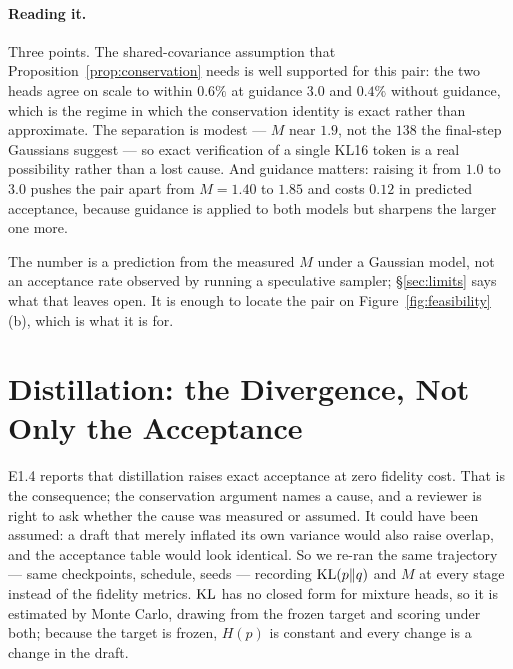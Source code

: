 \paragraph{Reading it.} Three points. The shared-covariance assumption that
Proposition~\ref{prop:conservation} needs is well supported for this pair: the two heads agree on
scale to within $0.6\%$ at guidance $3.0$ and $0.4\%$ without guidance, which is the regime in which
the conservation identity is exact rather than approximate. The separation is modest --- $M$ near
$1.9$, not the $138$ the final-step Gaussians suggest --- so exact verification of a single KL16
token is a real possibility rather than a lost cause. And guidance matters: raising it from $1.0$ to
$3.0$ pushes the pair apart from $M = 1.40$ to $1.85$ and costs $0.12$ in predicted acceptance,
because guidance is applied to both models but sharpens the larger one more.

The number is a prediction from the measured $M$ under a Gaussian model, not an acceptance rate
observed by running a speculative sampler; \S\ref{sec:limits} says what that leaves open. It is
enough to locate the pair on Figure~\ref{fig:feasibility}(b), which is what it is for.

\section{Distillation: the Divergence, Not Only the Acceptance}
\label{app:e15}

E1.4 reports that distillation raises exact acceptance at zero fidelity cost. That is the
consequence; the conservation argument names a cause, and a reviewer is right to ask whether the
cause was measured or assumed. It could have been assumed: a draft that merely inflated its own
variance would also raise overlap, and the acceptance table would look identical. So we re-ran the
same trajectory --- same checkpoints, schedule, seeds --- recording $\operatorname{KL}(p\|q)$ and $M$ at every
stage instead of the fidelity metrics. $\operatorname{KL}$ has no closed form for mixture heads, so it is estimated
by Monte Carlo, drawing from the frozen target and scoring under both; because the target is frozen,
$H(p)$ is constant and every change is a change in the draft.

